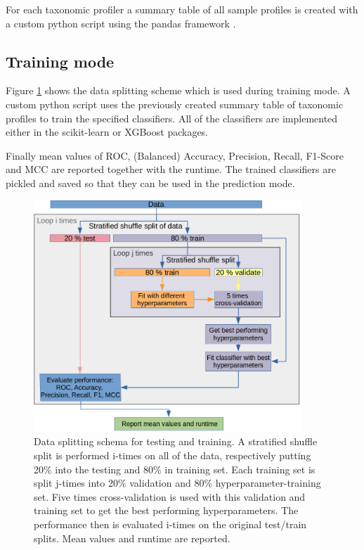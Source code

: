 
For each taxonomic profiler a summary table of all sample profiles is created with a custom python script using the pandas framework \citep{pandas}.

\subsection{Training mode}


Figure \ref{fig:trainsplit} shows the data splitting scheme which is used during training mode. A custom python script uses the previously created summary table of taxonomic profiles to train the specified classifiers. All of the classifiers are implemented either in the scikit-learn or XGBoost packages.

Finally mean values of ROC, (Balanced) Accuracy, Precision, Recall, F1-Score and MCC are reported together with the runtime. The trained classifiers are pickled and saved so that they can be used in the prediction mode. 

\begin{figure}
	\centering
	\includegraphics[width=0.9\textwidth]{Figures/ml_evaluation_datasplit_rev}
	\caption{Data splitting schema for testing and training. A stratified shuffle split is performed i-times on all of the data, respectively putting 20\% into the testing and 80\% in training set. Each training set is split j-times into 20\% validation and 80\% hyperparameter-training set. Five times cross-validation is used with this validation and training set to get the best performing hyperparameters. The performance then is evaluated i-times on the original test/train splits. Mean values and runtime are reported.}
	\label{fig:trainsplit}
\end{figure}


